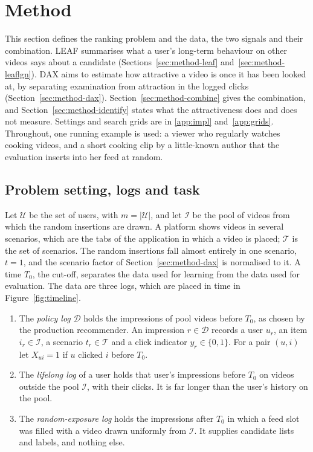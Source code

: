 \section{Method}
\label{sec:method}

This section defines the ranking problem and the data, the two signals and their combination. LEAF summarises what a user's
long-term behaviour on other videos says about a candidate (Sections~\ref{sec:method-leaf} and~\ref{sec:method-leaflgn}). DAX
aims to estimate how attractive a video is once it has been looked at, by separating examination from attraction in the logged clicks
(Section~\ref{sec:method-dax}). Section~\ref{sec:method-combine} gives the combination, and Section~\ref{sec:method-identify} states
what the attractiveness does and does not measure. Settings and search grids are in \ref{app:impl} and~\ref{app:grids}.
Throughout, one running example is used: a viewer who regularly watches cooking videos, and a short cooking clip by a little-known
author that the evaluation inserts into her feed at random.

\subsection{Problem setting, logs and task}
\label{sec:method-notation}

Let $\mathcal U$ be the set of users, with $m=|\mathcal U|$, and let $\mathcal I$ be the pool of videos from which the random insertions
are drawn. A platform shows videos in several scenarios, which are the tabs of the application in which a video is placed; $\mathcal T$
is the set of scenarios. The random insertions fall almost entirely in one scenario, $t=1$, and the scenario factor of
Section~\ref{sec:method-dax} is normalised to it. A time $T_0$, the cut-off, separates the data used for learning from the data used
for evaluation. The data are three logs, which are placed in time in Figure~\ref{fig:timeline}.
\begin{enumerate}
\item The \emph{policy log} $\mathcal D$ holds the impressions of pool videos before $T_0$, as chosen by the production recommender. An
  impression $r\in\mathcal D$ records a user $u_r$, an item $i_r\in\mathcal I$, a scenario $t_r\in\mathcal T$ and a click indicator
  $y_r\in\{0,1\}$. For a pair $(u,i)$ let $X_{ui}=1$ if $u$ clicked $i$ before $T_0$.
\item The \emph{lifelong log} of a user holds that user's impressions before $T_0$ on videos outside the pool $\mathcal I$, with their
  clicks. It is far longer than the user's history on the pool.
\item The \emph{random-exposure log} holds the impressions after $T_0$ in which a feed slot was filled with a video drawn uniformly
  from $\mathcal I$. It supplies candidate lists and labels, and nothing else.
\end{enumerate}

